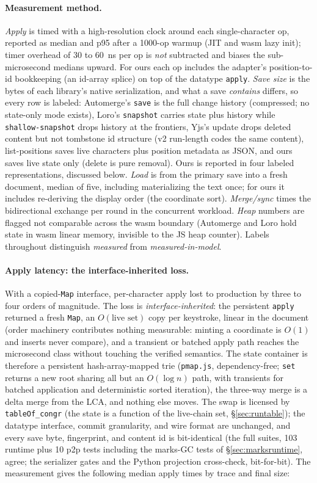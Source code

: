 \documentclass[11pt]{article}
\newcommand{\lean}[1]{\texttt{#1}}
\newcommand{\code}[1]{\texttt{#1}}
\begin{document}
\paragraph{Measurement method.} \emph{Apply} is
timed with a high-resolution clock around each single-character op,
reported as median and p95 after a 1000-op warmup (JIT and wasm lazy
init); timer overhead of 30 to 60~ns per op is \emph{not} subtracted and
biases the sub-microsecond medians upward. For ours each op includes the
adapter's position-to-id bookkeeping (an id-array splice) on top of the
datatype \code{apply}. \emph{Save size} is the bytes of each library's
native serialization, and what a save \emph{contains} differs, so every
row is labeled: Automerge's \code{save} is the full change history
(compressed; no state-only mode exists), Loro's \code{snapshot} carries
state plus history while \code{shallow-snapshot} drops history at the
frontiers, Yjs's update drops deleted content but not tombstone id
structure (v2 run-length codes the same content), list-positions saves
live characters plus position metadata as JSON, and ours saves live state
only (delete is pure removal). Ours is reported in four labeled
representations, discussed below. \emph{Load} is from the primary save
into a fresh document, median of five, including materializing the text
once; for ours it includes re-deriving the display order (the coordinate
sort). \emph{Merge/sync} times the bidirectional exchange per round in
the concurrent workload. \emph{Heap} numbers are flagged not comparable
across the wasm boundary (Automerge and Loro hold state in wasm linear
memory, invisible to the JS heap counter). Labels throughout distinguish
\emph{measured} from \emph{measured-in-model}.

\paragraph{Apply latency: the interface-inherited loss.} With a
copied-\code{Map} interface, per-character apply lost to
production by three to four orders of magnitude. The loss is
\emph{interface-inherited}: the persistent \code{apply} returned a fresh
\code{Map}, an $O(\text{live set})$ copy per keystroke, linear in the
document (order machinery contributes nothing measurable: minting a
coordinate is $O(1)$ and inserts never compare), and a
transient or batched apply path reaches the microsecond class
without touching the verified semantics. The state container is
therefore a persistent hash-array-mapped
trie (\code{pmap.js}, dependency-free; \code{set} returns a new root
sharing all but an $O(\log n)$ path, with transients for batched
application and deterministic sorted iteration), the three-way merge
is a delta merge from the LCA, and nothing else moves. The swap is
licensed by \lean{tableOf\_congr} (the state is a function of the
live-chain set, \S\ref{sec:runtable}); the datatype interface, commit
granularity, and wire format are unchanged, and every save byte,
fingerprint, and content id is bit-identical (the full suites, 103
runtime plus 10 p2p tests including the marks-GC tests of
\S\ref{sec:marksruntime}, agree; the serializer gates
and the Python projection cross-check, bit-for-bit). The measurement
gives the following median apply times by trace and final size:
\end{document}
